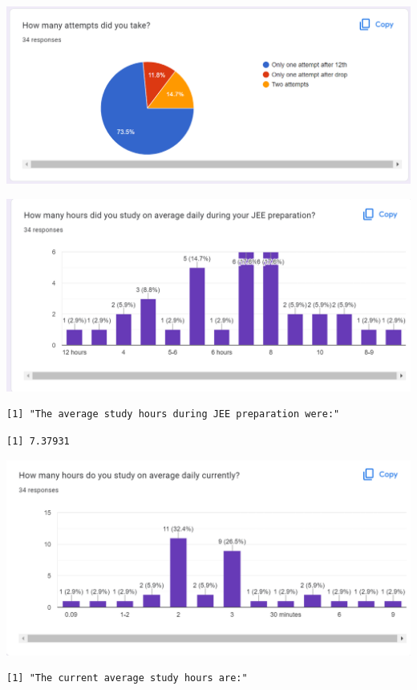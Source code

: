 \documentclass[
  letterpaper,
  DIV=11,
  numbers=noendperiod]{scrartcl}
\begin{document}
\includegraphics{Screenshot (385).png}

\includegraphics{Screenshot (386).png}

\begin{verbatim}
[1] "The average study hours during JEE preparation were:"
\end{verbatim}

\begin{verbatim}
[1] 7.37931
\end{verbatim}

\includegraphics{Screenshot (387).png}

\begin{verbatim}
[1] "The current average study hours are:"
\end{verbatim}
\end{document}

